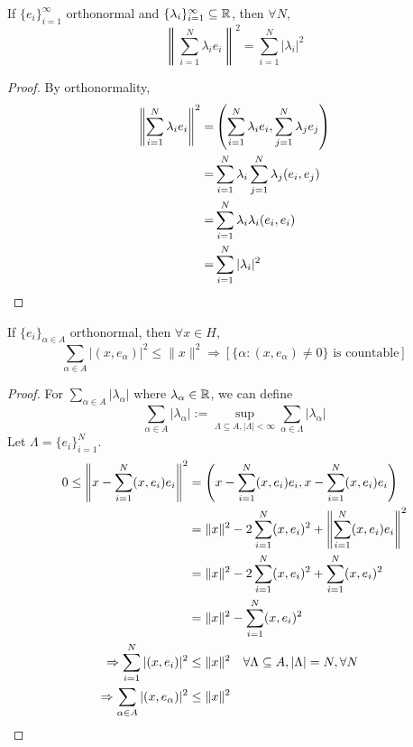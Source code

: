 \begin{thm}
    If $\{e_{i}\}_{i=1}^{\infty} $ orthonormal and $\{\lambda_{i}\}_{i=1}^{\infty} \subseteq \mathbb{R}$,
    then $\forall N$,
    \[
        \left\| \sum_{i=1}^N \lambda_i e_i\right\|^2 = \sum_{i=1}^N |\lambda_i|^2
    \]    
\end{thm}
\begin{proof}
        By orthonormality, 
        \begin{align*}
            \left\| \sum_{i =1}^N \lambda_i e_i \right\|^2 =& \left(\sum_{i = 1}^N \lambda_i e_i, 
            \sum_{j = 1}^N \lambda_j e_j \right) \\ 
            =& \sum_{i = 1}^N \lambda_i \sum_{j = 1}^N \lambda_j (e_i, e_j) \\
            =& \sum_{i = 1}^N \lambda_i \lambda_i (e_i, e_i) \\
            =& \sum_{i = 1}^N |\lambda_i|^2 \qedhere
        \end{align*}
\end{proof}
\begin{thm}
    If $\{e_{i}\}_{\alpha \in A}$ orthonormal, then $\forall x \in H$,  
    \[
        \sum_{\alpha \in A} |(x, e_\alpha)|^2 \leq \| x \|^2 
        \Rightarrow \left[ \{  \alpha : (x, e_\alpha) \neq 0 \} \text{ is countable} \right]
    \]
\end{thm}
\begin{proof}
    For $\sum_{\alpha \in A} |\lambda_\alpha|$ where $\lambda_\alpha \in \mathbb{R}$, we can define 
    \[
        \sum_{\alpha \in A} |\lambda_\alpha | := \sup_{\Lambda \subseteq A, |\Lambda| < \infty} 
        \sum_{\alpha \in \Lambda} |\lambda_\alpha|
    \]  
    Let $\Lambda = \{e_{i}\}_{i=1}^{N} $.
    \begin{align*}
        0 \leq \left\| x - \sum_{i = 1}^N (x, e_i) e_i \right\|^2 &= 
        \left(x - \sum_{i = 1}^N (x, e_i) e_i, x - \sum_{i = 1}^N (x, e_i) e_i \right) \\
        &= \| x \|^2 - 2\sum_{i = 1}^N (x, e_i)^2 + \left\| \sum_{i = 1}^N (x, e_i) e_i \right\|^2 \\
        &= \| x \|^2 - 2\sum_{i = 1}^N (x, e_i)^2 + \sum_{i = 1}^N (x, e_i)^2 \\
        &= \| x \|^2 - \sum_{i = 1}^N (x, e_i)^2 \\
        \Rightarrow \sum_{i = 1}^N |(x, e_i)|^2 &\leq \| x \|^2 \quad \forall \Lambda \subseteq A, |\Lambda| = N, \forall N \\
        \Rightarrow \sum_{\alpha \in A} |(x, e_\alpha)|^2 &\leq \| x \|^2 \qedhere
    \end{align*}
\end{proof}

